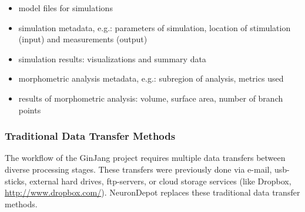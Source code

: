 \documentclass{frontiersSCNS} %
\begin{document}
\begin{itemize}
\item model files for simulations
\item simulation metadata, e.g.: parameters of simulation, location of
    stimulation (input) and measurements (output)
\item simulation results: visualizations and summary data
\item morphometric analysis metadata, e.g.: subregion of analysis, metrics used
\item results of morphometric analysis: volume, surface area, number of branch points
\end{itemize}


\subsubsection{Traditional Data Transfer Methods}

The workflow of the GinJang project requires multiple data transfers between
diverse processing stages. These transfers were previously done via e-mail,
usb-sticks, external hard drives, ftp-servers, or cloud storage services (like
Dropbox, \url{http://www.dropbox.com/}). NeuronDepot replaces these traditional data transfer methods.


\end{document}
